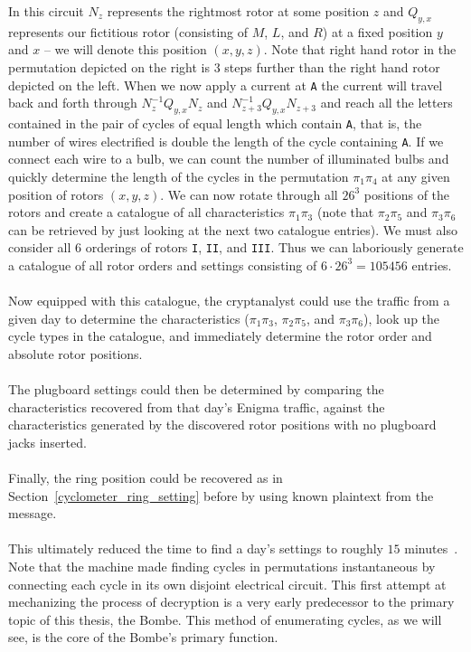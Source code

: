 \noindent In this circuit $N_z$ represents the rightmost rotor at some position
$z$ and $Q_{y,x}$ represents our fictitious rotor (consisting of $M$,
$L$, and $R$) at a fixed position $y$ and $x$ -- we will denote this
position $(x,y,z)$. Note that right hand
rotor in the permutation depicted on the right is 3 steps further
than the right hand rotor depicted on the left. When we now apply a
current at \texttt{A} the current will travel back and forth through
$N^{-1}_zQ_{y,x}N_z$ and $N^{-1}_{z+3}Q_{y,x}N_{z+3}$ and reach all
the letters contained
in the pair of cycles of equal length which contain \texttt{A}, that
is, the number of wires electrified is double the length of the cycle
containing \texttt{A}. If we connect each wire to a bulb, we can
count the number of illuminated bulbs and quickly determine the length of
the cycles in the permutation $\pi_1\pi_{4}$ at any given
position of rotors $(x,y,z)$. We can now rotate through all
$26^3$ positions of the rotors and create a catalogue of all
characteristics $\pi_1\pi_3$ (note that $\pi_2\pi_5$ and
  $\pi_3\pi_6$ can be retrieved by just looking at the next two
catalogue entries). We must also consider all 6 orderings of rotors
\texttt{I}, \texttt{II}, and \texttt{III}. Thus we can laboriously
generate a catalogue of all rotor orders and settings consisting of
$6\cdot 26^3 = 105456$ entries.
\\\\Now equipped with this catalogue, the cryptanalyst could use the
traffic from a given day to determine the characteristics
($\pi_1\pi_3$, $\pi_2\pi_5$, and $\pi_3\pi_6$), look up
the cycle types in the catalogue, and immediately determine the rotor order and
absolute rotor positions.
\\\\The plugboard settings could then be
determined by comparing the characteristics recovered from that day's Enigma
traffic, against the characteristics generated by the discovered rotor
positions with no plugboard jacks inserted.
\\\\Finally, the ring position
could be recovered as in Section~\ref{cyclometer_ring_setting} before
by using known plaintext from
the message.
\\\\This ultimately reduced the time to find a day's
settings to roughly $15$ minutes~\cite[p.~225]{Rejewski1981}. Note that the machine made finding
cycles in permutations
instantaneous by connecting each cycle in its own disjoint electrical
circuit. This first attempt at mechanizing the process of decryption
is a very early predecessor to the primary topic of this thesis, the
Bombe. This method of enumerating cycles, as we will see, is the core
of the Bombe's primary function.
